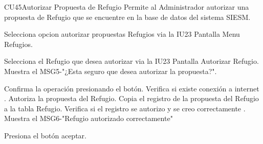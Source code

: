\begin{UseCase}{CU45}{Autorizar Propuesta de Refugio}{
		Permite al Administrador autorizar una propuesta de Refugio que se encuentre en la base de datos del sistema SIESM.\\
}
	
\end{UseCase}



\begin{UCtrayectoria}
	\item\UCactor Selecciona opcion autorizar propuestas Refugios via la IU23 Pantalla Menu Refugios.
	\item\UCactor Selecciona el Refugio que desea autorizar via la IU23 Pantalla Autorizar Refugio.
	\UCpaso Muestra el MSG5-"¿Esta seguro que desea autorizar la propuesta?".
	\item\UCactor Confirma la operación presionando el botón.
	\UCpaso Verifica si existe conexión a internet .
	\UCpaso Autoriza la propuesta del Refugio.
	\UCpaso Copia el registro de la propuesta del Refugio a la tabla Refugio.
	\UCpaso Verifica si el registro se autorizo y se creo correctamente .
	\UCpaso Muestra el MSG6-"Refugio autorizado correctamente"
	\item\UCactor Presiona el botón aceptar.
\end{UCtrayectoria}


